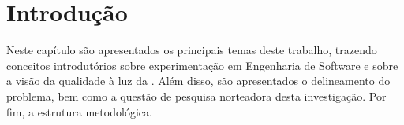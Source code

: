 \chapter{Introdução}   
\label{ch:intro}

Neste capítulo são apresentados os principais temas deste trabalho, trazendo conceitos introdutórios sobre experimentação em Engenharia de Software e sobre a visão da qualidade à luz da . Além disso, são apresentados o delineamento do problema, bem como a questão de pesquisa norteadora desta investigação. Por fim, a estrutura metodológica.













